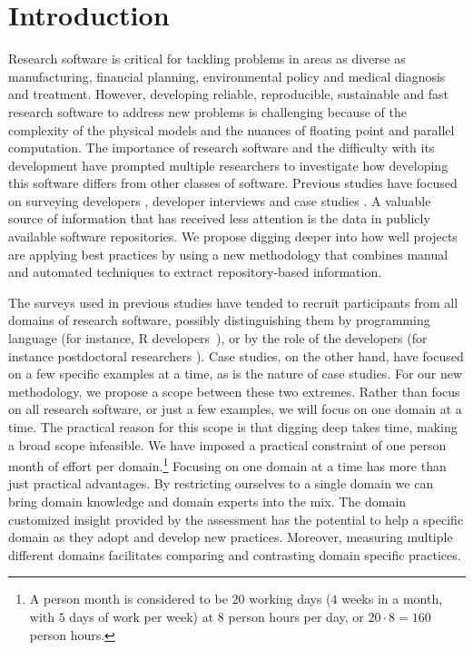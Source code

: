 \documentclass[runningheads]{llncs}
\begin{document}
\section{Introduction} \label{SecIntroduction}

Research software is critical for tackling problems in areas as diverse as
manufacturing, financial planning, environmental policy and medical diagnosis
and treatment.  However, developing reliable, reproducible, sustainable and fast
research software to address new problems is challenging because of the
complexity of the physical models and the nuances of floating point and parallel
computation. The importance of research software and the difficulty with its
development have prompted multiple researchers to investigate how developing
this software differs from other classes of software.  Previous studies have
focused on surveying developers
\cite{HannayEtAl2009,Nguyen-HoanEtAl2010,PintoEtAl2018}, developer interviews
\cite{Kelly2013} and case studies \cite{CarverEtAl2007,Segal2005}.  A
valuable source of information that has received less attention is the data in
publicly available software repositories.  We propose digging deeper into how
well projects are applying best practices by using a new methodology that
combines manual and automated techniques to extract repository-based
information.

The surveys used in previous studies have tended to recruit participants from
all domains of research software, possibly distinguishing them by programming
language (for instance, R developers~\cite{PintoEtAl2018}), or by the role of
the developers (for instance postdoctoral researchers \cite{UditAndKatz2017}).
Case studies, on the other hand, have focused on a few specific examples at a
time, as is the nature of case studies.  For our new methodology, we propose a
scope between these two extremes.  Rather than focus on all research software,
or just a few examples, we will focus on one domain at a time. The practical
reason for this scope is that digging deep takes time, making a broad scope
infeasible. We have imposed a practical constraint of one person month of effort
per domain.\footnote{A person month is considered to be $20$ working days ($4$
weeks in a month, with $5$ days of work per week) at $8$ person hours per day,
or $20 \cdot 8 = 160$ person hours.} Focusing on one domain at a time has more
than just practical advantages.  By restricting ourselves to a single domain we
can bring domain knowledge and domain experts into the mix.  The domain
customized insight provided by the assessment has the potential to help a
specific domain as they adopt and develop new practices.  Moreover, measuring
multiple different domains facilitates comparing and contrasting domain specific
practices.
\end{document}
